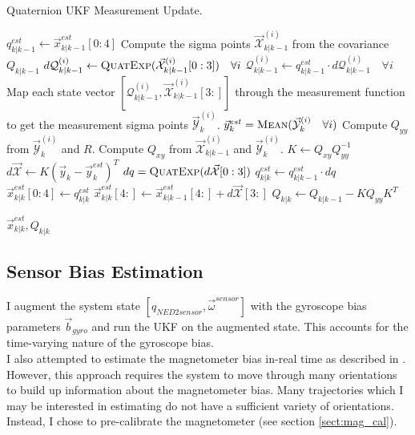 \documentclass[conference]{IEEEtran}
\begin{document}
\begin{algorithm}
  \caption{Quaternion UKF Measurement Update.}
  \label{alg:updatemeas}
  \begin{algorithmic}
      \State $q_{k|k-1}^{est} \gets \vec{x}_{k|k-1}^{est}[0:4]$
      \State Compute the sigma points $\vec{\mathcal{X}}^{(i)}_{k|k-1}$ from the covariance $Q_{k|k-1}$
      \State $d\mathcal{Q}^{(i)}_{k|k-1} \gets \textproc{QuatExp}(\vec{\mathcal{X}}^{(i)}_{k|k-1}[0:3]) \quad \forall i$
      \State $\mathcal{Q}^{(i)}_{k|k-1} \gets q_{k|k-1}^{est} \cdot d\mathcal{Q}^{(i)}_{k|k-1} \quad \forall i$
      \State Map each state vector $[\mathcal{Q}^{(i)}_{k|k-1}, \vec{\mathcal{X}}^{(i)}_{k|k-1}[3:]]$ through the measurement function to get the measurement sigma points $\vec{\mathcal{Y}}^{(i)}_{k}$.
      \State $\vec{y}^{est}_{k} = \textproc{Mean}(\vec{\mathcal{Y}}^{(i)}_{k} \quad \forall i)$
      \State Compute $Q_{yy}$ from $\vec{\mathcal{Y}}^{(i)}_{k}$ and $R$.
      \State Compute $Q_{xy}$ from $\vec{\mathcal{X}}^{(i)}_{k|k-1}$ and $\vec{\mathcal{Y}}^{(i)}_{k}$.
      \State $K \gets Q_{xy} Q_{yy}^{-1}$
      \State $d\vec{\mathcal{X}} \gets K (\vec{y}_{k} - \vec{y}^{est}_{k})^T$
      \State $dq = \textproc{QuatExp}(d\vec{\mathcal{X}}[0:3])$
      \State $q_{k|k}^{est} \gets q_{k|k-1}^{est} \cdot dq$
      \State $\vec{x}^{est}_{k|k}[0:4] \gets q_{k|k}^{est}$
      \State $\vec{x}^{est}_{k|k}[4:] \gets \vec{x}^{est}_{k|k-1}[4:] + d\vec{\mathcal{X}}[3:]$
      \State $Q_{k|k} \gets Q_{k|k-1} - K Q_{yy} K^T$

      \Return $\vec{x}_{k|k}^{est}, Q_{k|k}$
    \EndFunction
  \end{algorithmic}
\end{algorithm}

\subsection{Sensor Bias Estimation}
I augment the system state $[q_{NED2sensor}, \vec{\omega}^{sensor}]$ with the gyroscope bias parameters $\vec{b}_{gyro}$ and run the UKF on the augmented state. This accounts for the time-varying nature of the gyroscope bias.\\

I also attempted to estimate the magnetometer bias in-real time as described in \cite{Crassidis2005}. However, this approach requires the system to move through many orientations to build up information about the magnetometer bias. Many trajectories which I may be interested in estimating do not have a sufficient variety of orientations. Instead, I chose to pre-calibrate the magnetometer (see section \ref{sect:mag_cal}).
\end{document}
